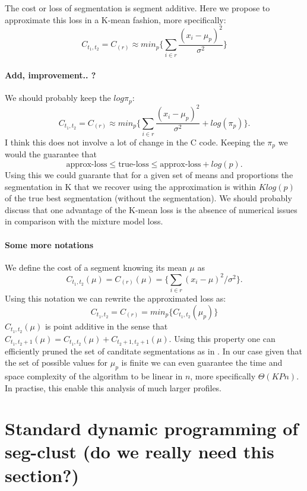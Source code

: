 \documentclass[a4paper,12pt,twoside]{report}
\begin{document}
The cost or loss of segmentation is segment additive. 
Here we propose to approximate this loss in a K-mean fashion, more specifically:
$$ C_{t_1, t_2} =C_{(r)} \approx  min_p \{ \sum_{i \in r}\frac{(x_i - \mu_p)^2} {\sigma^2 }\}$$ 


\paragraph{Add, improvement.. ?}
We should probably keep the $log\pi_p$:
$$ C_{t_1, t_2} =C_{(r)} \approx  min_p \{ \sum_{i \in r}\frac{(x_i - \mu_p)^2} {\sigma^2 } + log(\pi_p) \} .$$
I think this does not involve a lot of change in the C code.
Keeping the $\pi_p$ we would the guarantee that
$$ \text{approx-loss} \leq \text{true-loss}
\leq  \text{approx-loss} + log(p). $$
Using this we could guarante that for a given set of means and proportions the segmentation in K that we recover using the approximation is within $Klog(p)$ of the true best segmentation (without the segmentation).
We should probably discuss that one advantage of the K-mean loss is the absence of numerical issues in comparison with the mixture model loss.


\paragraph{Some more notations}

We define the cost of a segment knowing its mean $\mu$ as
$$ C_{t_1, t_2} (\mu) =C_{(r)}  (\mu) = \{ \sum_{i \in r} (x_i - \mu)^2  / \sigma^2 \}.$$
Using this notation we can rewrite the approximated loss as:
$$ C_{t_1, t_2} =C_{(r)} = min_p \{  C_{t_1, t_2} (\mu_p) \}$$
$C_{t_1, t_2} (\mu)$ is point additive in the sense that $C_{t_1, t_2+1} (\mu) = C_{t_1, t_2} (\mu) + C_{t_2 +1, t_2+1} (\mu)$.
Using this property one can efficiently pruned the set of canditate segmentations as in \cite{rigaill_2010}. 
In our case given that the set of possible values for $\mu_p$ is finite we can even guarantee the time and space complexity of the algorithm to be linear in $n$, more specifically $\Theta(KPn)$. 
In practise, this enable this analysis of much larger profiles.


\section{Standard dynamic programming of seg-clust (do we really need this section?)}
\end{document}
